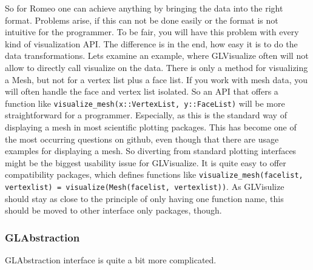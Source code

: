 So for Romeo one can achieve anything by bringing the data into the right format.
Problems arise, if this can not be done easily or the format is not intuitive for the programmer.
To be fair, you will have this problem with every kind of visualization API. 
The difference is in the end, how easy it is to do the data transformations. 
Lets examine an example, where GLVisualize often will not allow to directly call visualize on the data.
There is only a method for visualizing a Mesh, but not for a vertex list plus a face list. If you work with mesh data, you will often handle the face and vertex list isolated.
So an API that offers a function like \texttt{visualize\_mesh(x::VertexList, y::FaceList)} will be more straightforward for a programmer.
Especially, as this is the standard way of displaying a mesh in most scientific plotting packages. This has become one of the most occurring questions on github, even though that there are usage examples for displaying a mesh.
So diverting from standard plotting interfaces might be the biggest usability issue for GLVisualize.
It is quite easy to offer compatibility packages, which defines functions like
\texttt{visualize\_mesh(facelist, vertexlist) = visualize(Mesh(facelist, vertexlist))}.
As GLVisulize should stay as close to the principle of only having one function name, this should be moved to other interface only packages, though.


\subsubsection{GLAbstraction}
GLAbstraction interface is quite a bit more complicated.

